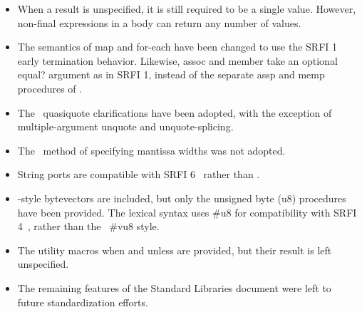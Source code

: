 \begin{itemize}
\item When a result is unspecified, it is still required to be a single value.
However, non-final expressions
in a body can return any number of values.

\item The semantics of {\cf map} and {\cf for-each} have been changed to use
the SRFI 1~\cite{srfi1} early termination behavior. Likewise,
{\cf assoc} and {\cf member} take an optional {\cf equal?} argument as in SRFI 1,
instead of the separate {\cf assp} and {\cf memp} procedures of \rsixrs.

\item The \rsixrs~{\cf quasiquote} clarifications have been adopted, with the
exception of multiple-argument {\cf unquote} and
{\cf unquote-splicing}.

\item The \rsixrs~method of specifying mantissa widths was not adopted.

\item String ports are compatible with SRFI 6~\cite{srfi6} rather than \rsixrs.

\item \rsixrs{}-style bytevectors are included, but 
only the unsigned byte ({\cf u8}) procedures have been provided.
The lexical syntax uses {\cf \#u8} for compatibility
with SRFI 4~\cite{srfi4}, rather than the \rsixrs~{\cf \#vu8} style.

\item The utility macros {\cf when} and {\cf unless} are provided, but 
their result is left unspecified.

\item The remaining features of the Standard Libraries document were
left to future standardization efforts.

\end{itemize}

